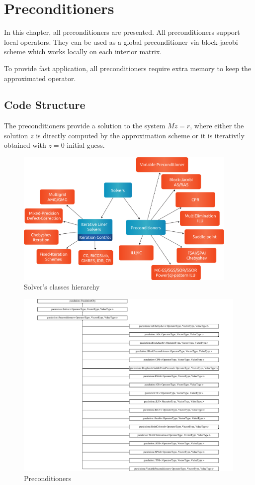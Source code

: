 \chapter{Preconditioners}

In this chapter, all preconditioners are presented. All preconditioners support local operators. They can be used as a global preconditioner via block-jacobi scheme which works locally on each interior matrix.

To provide fast application, all preconditioners require extra memory to keep the approximated operator.

\section{Code Structure}

The preconditioners provide a solution to the system $Mz=r$, where either the solution $z$ is directly computed by the approximation scheme or it is iterativily obtained with $z=0$ initial guess.

\begin{figure}[!ht]
\centering
\includegraphics[width=0.95\textwidth]{./fig/solver.pdf}
\caption{Solver's classes hierarchy}
\label{paralution-solvers}
\end{figure}

\begin{figure}[!ht]
\centering
\includegraphics[width=0.99\textwidth]{./fig/body/classparalution_1_1_preconditioner.pdf}
\caption{Preconditioners}
\end{figure}

